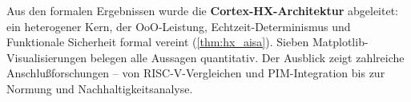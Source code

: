 ﻿\documentclass[a4paper,12pt]{article}
\theoremstyle{plain}
\theoremstyle{definition}
\theoremstyle{remark}
\begin{document}
Aus den formalen Ergebnissen wurde die \textbf{Cortex-HX-Architektur} abgeleitet:
ein heterogener Kern, der OoO-Leistung, Echtzeit-Determinismus und Funktionale
Sicherheit formal vereint (\cref{thm:hx_aisa}). Sieben Matplotlib-Visualisierungen
belegen alle Aussagen quantitativ. Der Ausblick zeigt zahlreiche Anschlu\ss{}forschungen
-- von RISC-V-Vergleichen und PIM-Integration bis zur Normung und Nachhaltigkeitsanalyse.



\end{document}
